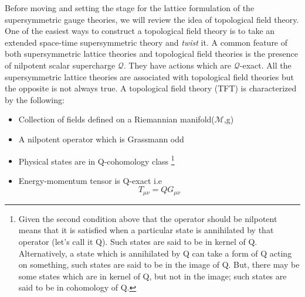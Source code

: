 Before moving and setting the stage for the lattice formulation of the supersymmetric gauge theories, we will review
the idea of topological field theory. One of the easiest ways to construct a topological field theory is to 
take an extended space-time supersymmetric theory and \textit{twist} it. A common feature of both supersymmetric lattice
 theories and topological field theories is the presence of nilpotent scalar supercharge $\mathcal{Q}$. 
 They have actions which are $\mathcal{Q}$-exact. 
All the supersymmetric lattice theories are associated with topological field theories but the opposite is not always true. 
A topological field theory (TFT) is characterized by the following:
\vspace{3mm} 
\begin{itemize}
\item Collection of fields defined on a Riemannian manifold($\textbf{$\mathcal{M}$}$,g)
\item A nilpotent operator which is Grassmann odd
\item Physical states are in Q-cohomology class \footnote{Given the second condition above that the operator should 
be nilpotent means that it is satisfied when a particular state is annihilated by that operator (let's call it Q). Such states 
are said to be in kernel of Q. Alternatively, a state which is annihilated by Q can take a form of Q acting on something, 
such states are said to be in the image of Q. But, there may be some states which are in kernel of Q, but not in the image; 
such states are said to be in cohomology of Q.} 
\item Energy-momentum tensor is Q-exact i.e \[ T_{\mu\nu} = Q G_{\mu\nu} \]
\end{itemize}

